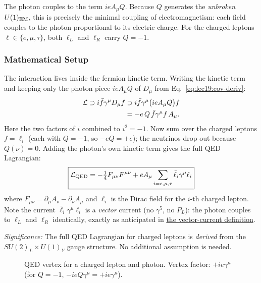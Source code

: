 The photon couples to the term $ie A_\mu Q$. Because $Q$ generates the
\emph{unbroken} $U(1)_{\rm EM}$, this is precisely the minimal coupling
of electromagnetism: each field couples to the photon proportional to its
electric charge. For the charged leptons $\ell \in \{e,\mu,\tau\}$, both
$\ell_L$ and $\ell_R$ carry $Q = -1$.

\subsubsection*{Mathematical Setup}

The interaction lives inside the fermion kinetic term. Writing the
kinetic term and keeping only the photon piece $ieA_\mu Q$ of $D_\mu$
from Eq.~\eqref{eq:lec19:cov-deriv}:
\begin{align}
  \mathcal{L} \supset i\bar f\gamma^\mu D_\mu f
  &\supset i\bar f\gamma^\mu\bigl(ieA_\mu Q\bigr)f
  \notag\\
  &= -e\,Q\,\bar f\gamma^\mu f\,A_\mu .
  \label{eq:lec19:qed-extraction}
\end{align}
Here the two factors of $i$ combined to $i^2=-1$. Now sum over the
charged leptons $f=\ell_i$ (each with $Q=-1$, so $-eQ=+e$); the
neutrinos drop out because $Q(\nu)=0$. Adding the photon's own kinetic
term gives the full QED Lagrangian:
\begin{equation}
  \boxed{
    \mathcal{L}_{\mathrm{QED}} = -\tfrac14 F_{\mu\nu}F^{\mu\nu}
                  + e A_\mu\sum_{i=e,\mu,\tau}\bar\ell_i\gamma^\mu\ell_i
  }
  \label{eq:lec19:qed-lagrangian}
\end{equation}
where $F_{\mu\nu} = \partial_\mu A_\nu - \partial_\nu A_\mu$ and
$\ell_i$ is the Dirac field for the $i$-th charged lepton. Note the
current $\bar\ell_i\gamma^\mu\ell_i$ is a \emph{vector} current
(no $\gamma^5$, no $P_L$): the photon couples to $\ell_L$ and $\ell_R$
identically, exactly as anticipated in
\hyperref[def:dfn:lec19:currents]{the vector-current definition}.

\textit{Significance:} The full QED Lagrangian for charged leptons is
\emph{derived} from the $SU(2)_L\times U(1)_Y$ gauge structure.
No additional assumption is needed.

\begin{figure}[ht]
\centering
{}
\caption{QED vertex for a charged lepton and photon. Vertex factor: $+ie\gamma^\mu$
  (for $Q=-1$, $-ieQ\gamma^\mu = +ie\gamma^\mu$).}
\label{fig:lec19:qed-vertex}
\end{figure}

